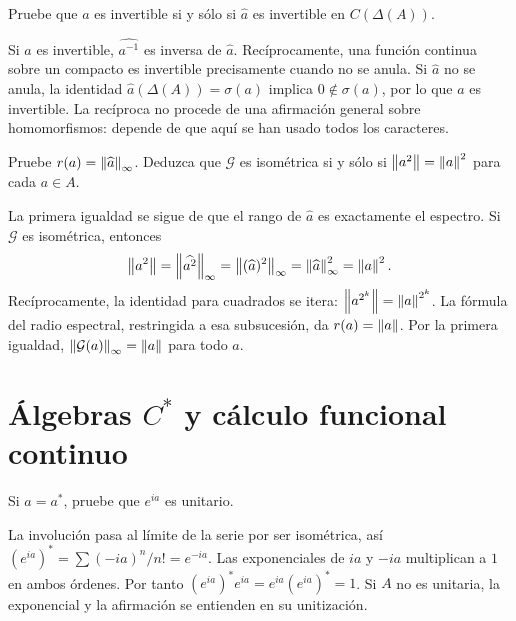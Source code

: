 \begin{ejercicio}\label{ej:v3-l24-5}
Pruebe que $a$ es invertible si y sólo si $\widehat a$ es invertible en $C(\Delta(A))$.
\end{ejercicio}
\begin{solucion}
Si $a$ es invertible, $\widehat{a^{-1}}$ es inversa de $\widehat a$. Recíprocamente, una función continua sobre un compacto es invertible precisamente cuando no se anula. Si $\widehat a$ no se anula, la identidad $\widehat a(\Delta(A))=\sigma(a)$ implica $0\notin\sigma(a)$, por lo que $a$ es invertible. La recíproca no procede de una afirmación general sobre homomorfismos: depende de que aquí se han usado todos los caracteres.
\end{solucion}

\begin{ejercicio}\label{ej:v3-l24-6}
Pruebe $r(a)=\left\lVert\widehat a\right\rVert_\infty$. Deduzca que $\mathcal G$ es isométrica si y sólo si $\left\lVert a^2\right\rVert=\left\lVert a\right\rVert^2$ para cada $a\in A$.
\end{ejercicio}
\begin{solucion}
La primera igualdad se sigue de que el rango de $\widehat a$ es exactamente el espectro. Si $\mathcal G$ es isométrica, entonces
\[
 \left\lVert a^2\right\rVert=\left\lVert\widehat{a^2}\right\rVert_\infty
 =\left\lVert(\widehat a)^2\right\rVert_\infty=\left\lVert\widehat a\right\rVert_\infty^2=\left\lVert a\right\rVert^2.
\]
Recíprocamente, la identidad para cuadrados se itera: $\left\lVert a^{2^k}\right\rVert=\left\lVert a\right\rVert^{2^k}$. La fórmula del radio espectral, restringida a esa subsucesión, da $r(a)=\left\lVert a\right\rVert$. Por la primera igualdad, $\left\lVert\mathcal G(a)\right\rVert_\infty=\left\lVert a\right\rVert$ para todo $a$.
\end{solucion}

\chapter{Álgebras \texorpdfstring{$C^*$}{C*} y cálculo funcional continuo}

\begin{ejercicio}\label{ej:v3-l25-1}
Si $a=a^*$, pruebe que $e^{ia}$ es unitario.
\end{ejercicio}
\begin{solucion}
La involución pasa al límite de la serie por ser isométrica, así $(e^{ia})^*=\sum(-ia)^n/n!=e^{-ia}$. Las exponenciales de $ia$ y $-ia$ multiplican a $1$ en ambos órdenes. Por tanto $(e^{ia})^*e^{ia}=e^{ia}(e^{ia})^*=1$. Si $A$ no es unitaria, la exponencial y la afirmación se entienden en su unitización.
\end{solucion}

